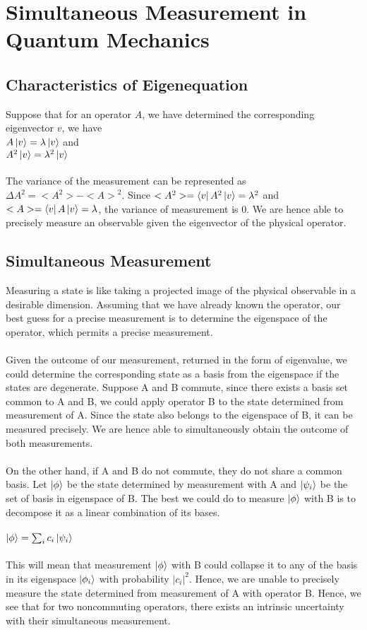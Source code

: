 \documentclass{report}
\begin{document}
\section{Simultaneous Measurement in Quantum Mechanics}
\subsection{Characteristics of Eigenequation}
Suppose that for an operator $A$, we have determined the corresponding eigenvector $v$, we have \\
$A\ket{v}=\lambda \ket{v}$ and \\
$A^2\ket{v}=\lambda^2 \ket{v}$ \\ \\
The variance of the measurement can be represented as ${\Delta A}^2 = <A^2> - {<A>}^2$. Since $<A^2>=\bra{v}A^2\ket{v}=\lambda^2$ and $<A>=\bra{v}A\ket{v}=\lambda$, the variance of measurement is 0. We are hence able to precisely measure an observable given the eigenvector of the physical operator. 
\subsection{Simultaneous Measurement}
Measuring a state is like taking a projected image of the physical observable in a desirable dimension. Assuming that we have already known the operator, our best guess for a precise measurement is to determine the eigenspace of the operator, which permits a precise measurement. \\ \\
Given the outcome of our measurement, returned in the form of eigenvalue, we could determine the corresponding state as a basis from the eigenspace if the states are degenerate. Suppose A and B commute, since there exists a basis set common to A and B, we could apply operator B to the state determined from measurement of A. Since the state also belongs to the eigenspace of B, it can be measured precisely. We are hence able to simultaneously obtain the outcome of both measurements. \\ \\
On the other hand, if A and B do not commute, they do not share a common basis. Let $\ket{\phi}$ be the state determined by measurement with A and $\ket{\psi_i}$ be the set of basis in eigenspace of B. The best we could do to measure $\ket{\phi}$ with B is to decompose it as a linear combination of its bases. \\ \\
$\ket{\phi}=\sum_{i} c_i\ket{\psi_i}$ \\ \\
This will mean that measurement $\ket{\phi}$ with B could collapse it to any of the basis in its eigenspace $\ket{\phi_i}$ with probability $|c_i|^2$. Hence, we are unable to precisely measure the state determined from measurement of A with operator B. Hence, we see that for two noncommuting operators, there exists an intrinsic uncertainty with their simultaneous measurement.
\end{document}
